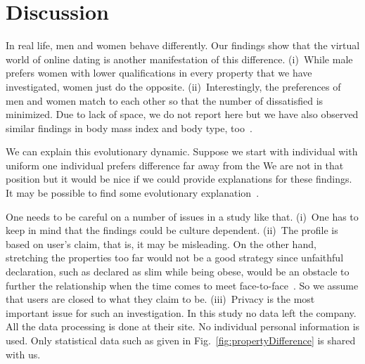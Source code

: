 \documentclass[journal,comsoc]{IEEEtran}
\newcommand{\hbSection}[1]{\section{#1}}
\newcommand{\hbIdea}[1]{{\color{red}{\scriptsize [{#1}]}}}
\newcommand{\reffig}[1]{Fig.~\ref{#1}}
\begin{document}
\hbSection{Discussion}

\hbIdea{discussion} %
In real life, 
men and women behave differently.
Our findings show that 
the virtual world of online dating is another manifestation of this difference.
%
(i)~While male prefers women with lower qualifications in every property 
that we have investigated, 
women just do the opposite. 
%
(ii)~Interestingly, the preferences of men and women match to each other so that 
the number of dissatisfied is minimized.
Due to lack of space, we do not report here but 
we have also observed similar findings in body mass index and body type, 
too~\cite{
	Bingol2012PartnerArxiv}. 
	
We can explain this evolutionary dynamic.
Suppose we start with individual with uniform one individual prefers difference far away from the
We are not in that position but 
it would be nice if we could provide explanations for these findings.
It may be possible to find some evolutionary 
explanation~\cite{
	Kenrick1992,
	Silverman1992,
	Pawlowski2000Nature}.




\hbIdea{warnings} %
One needs to be careful on a number of issues in a study like that.
% 
(i)~One has to keep in mind that 
the findings could be culture dependent.
%
(ii)~The profile is based on user's claim, 
that is, 
it may be misleading. 
On the other hand, 
stretching the properties too far would not be a good strategy 
since unfaithful declaration, 
such as declared as slim while being obese, 
would be an obstacle to further the relationship
when the time comes to meet face-to-face~\cite{
	Norcie2013LNCS,
	Ellison2013}.
So we assume that users are closed to what they claim to be.
%
(iii)~Privacy is the most important issue for such an investigation.
In this study no data left the company. 
All the data processing is done at their site.
No individual personal information is used.
Only statistical data such as given in \reffig{fig:propertyDifference} is shared with us.
\end{document}

